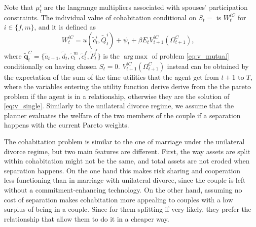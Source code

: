 \documentclass[12pt]{article}
\numberwithin{table}{section}
\DeclareMathOperator*{\argmax}{arg\,max}
\begin{document}
Note that $\mu^i_t$ are the langrange multipliers associated with spouses' participation constraints.
The individual value of cohabitation conditional on $S_t=$ is  $W_{t}^{iC}$ for $i\in\{f,m\}$, and it is defined as 
\begin{equation}
W_{t}^{iC}=u(\tilde{c}_t^{i},\tilde{Q}_t^{i})+\psi_t+\beta E_t V_{t+1}^{iC}(\Omega^{C}_{t+1}),
\end{equation}
where
$\mathbf{\tilde{q}}^{C}_t=\{\tilde{a}_{t+1},\tilde{d}_{t},\tilde{c}^{m}_{t},\tilde{c}^{f}_{t},\tilde{P}^{f}_t\}$ is the $\argmax$ of problem \eqref{eq:v_mutual} conditionally on having chosen $S_t=0$. $V_{t+1}^{iC}(\Omega^{C}_{t+1})$ instead can be obtained by the expectation of the sum of the time utilities that the agent get from $t+1$ to $T$, where the variables entering the utility function derive derive from the the pareto problem if the agent is in a relationship, otherwise they are the solution of \eqref{eq:v_single}.  Similarly to the unilateral divorce regime, we assume that the planner evaluates the welfare of the two members of the couple if a separation happens with the current Pareto weights.

The cohabitation problem is similar to the one of marriage under the unilateral divorce regime, but two main features are different. First, the way assets are split within cohabitation might not be the same, and total assets are not eroded when separation happens. On the one hand this makes risk sharing and cooperation less functioning than in marriage with unilateral divorce, since the couple is left without a commitment-enhancing technology. On the other hand, assuming no cost of separation makes cohabitation more appealing to couples with a low surplus of being in a couple. Since for them splitting if very likely, they prefer the relationship that allow them to do it in a cheaper way.
\end{document}

